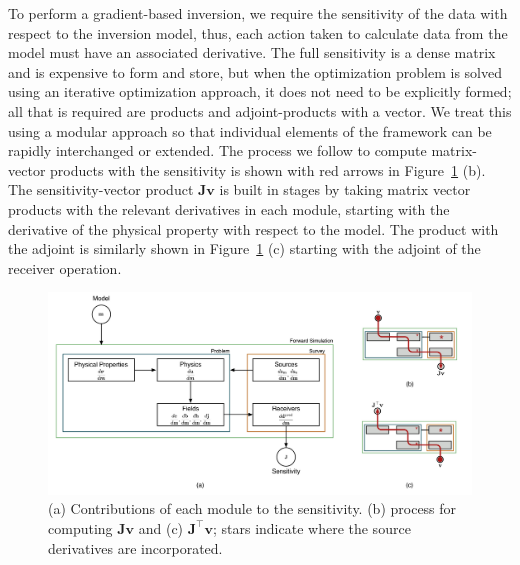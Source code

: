 To perform a gradient-based inversion, we require the sensitivity of the data
with respect to the inversion model, thus, each action taken to calculate data
from the model must have an associated derivative. The full sensitivity is a
dense matrix and is expensive to form and store, but when the optimization
problem is solved using an iterative optimization approach, it does not need
to be explicitly formed; all that is required are products and adjoint-products
with a vector. We treat this using a modular approach so that individual
elements of the framework can be rapidly interchanged or extended. The process
we follow to compute matrix-vector products with the sensitivity is shown with red arrows in
Figure~\ref{fig:Jvec} (b). The sensitivity-vector product $\mathbf{Jv}$ is built in stages by taking matrix
vector products with the relevant derivatives in each module, starting with the derivative of the physical property with respect to the model.
The product with the adjoint is similarly shown in Figure~\ref{fig:Jvec} (c) starting with the adjoint of the receiver operation.


{%
\begin{figure}[htb!]
    \centering
    \includegraphics[width=\textwidth]{images/simpegEM_sensitivity_J_JTvec_5.png}
    \caption{(a) Contributions of each module to the sensitivity. (b) process for computing $\mathbf{J} \mathbf{v}$ and (c) $\mathbf{J}^{\top}\mathbf{v}$; stars indicate where the source derivatives are incorporated.}
\label{fig:Jvec}
\end{figure}
}


